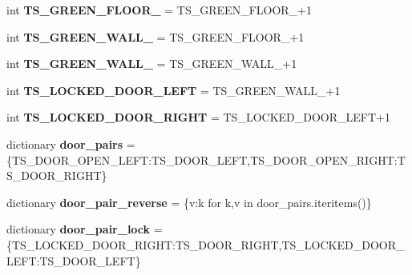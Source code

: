 \begin{DoxyCompactItemize}
\item 
\hypertarget{namespaceconstants_a92a2d451d178d3f6e24c56848dfb8287}{}int {\bfseries T\+S\+\_\+\+G\+R\+E\+E\+N\+\_\+\+F\+L\+O\+O\+R\+\_} = T\+S\+\_\+\+G\+R\+E\+E\+N\+\_\+\+F\+L\+O\+O\+R\+\_+1\label{namespaceconstants_a92a2d451d178d3f6e24c56848dfb8287}

\item 
\hypertarget{namespaceconstants_af18ce6dc21768935be0a46b621e1cbc2}{}int {\bfseries T\+S\+\_\+\+G\+R\+E\+E\+N\+\_\+\+W\+A\+L\+L\+\_} = T\+S\+\_\+\+G\+R\+E\+E\+N\+\_\+\+F\+L\+O\+O\+R\+\_+1\label{namespaceconstants_af18ce6dc21768935be0a46b621e1cbc2}

\item 
\hypertarget{namespaceconstants_a00c3306c4ec859606c2648abacd568d2}{}int {\bfseries T\+S\+\_\+\+G\+R\+E\+E\+N\+\_\+\+W\+A\+L\+L\+\_} = T\+S\+\_\+\+G\+R\+E\+E\+N\+\_\+\+W\+A\+L\+L\+\_+1\label{namespaceconstants_a00c3306c4ec859606c2648abacd568d2}

\item 
\hypertarget{namespaceconstants_a06dbe0933db77dc5753d87358e333291}{}int {\bfseries T\+S\+\_\+\+L\+O\+C\+K\+E\+D\+\_\+\+D\+O\+O\+R\+\_\+\+L\+E\+F\+T} = T\+S\+\_\+\+G\+R\+E\+E\+N\+\_\+\+W\+A\+L\+L\+\_+1\label{namespaceconstants_a06dbe0933db77dc5753d87358e333291}

\item 
\hypertarget{namespaceconstants_a42161cdb4b8067fbd531bb283c3a1cc9}{}int {\bfseries T\+S\+\_\+\+L\+O\+C\+K\+E\+D\+\_\+\+D\+O\+O\+R\+\_\+\+R\+I\+G\+H\+T} = T\+S\+\_\+\+L\+O\+C\+K\+E\+D\+\_\+\+D\+O\+O\+R\+\_\+\+L\+E\+F\+T+1\label{namespaceconstants_a42161cdb4b8067fbd531bb283c3a1cc9}

\item 
\hypertarget{namespaceconstants_acee0d9ba287ea1041ff210299cc5dca2}{}dictionary {\bfseries door\+\_\+pairs} = \{T\+S\+\_\+\+D\+O\+O\+R\+\_\+\+O\+P\+E\+N\+\_\+\+L\+E\+F\+T\+:\+T\+S\+\_\+\+D\+O\+O\+R\+\_\+\+L\+E\+F\+T,T\+S\+\_\+\+D\+O\+O\+R\+\_\+\+O\+P\+E\+N\+\_\+\+R\+I\+G\+H\+T\+:\+T\+S\+\_\+\+D\+O\+O\+R\+\_\+\+R\+I\+G\+H\+T\}\label{namespaceconstants_acee0d9ba287ea1041ff210299cc5dca2}

\item 
\hypertarget{namespaceconstants_a7055052dd09e7b35cd97e2f18f3c769b}{}dictionary {\bfseries door\+\_\+pair\+\_\+reverse} = \{v\+:k for k,v in door\+\_\+pairs.\+iteritems()\}\label{namespaceconstants_a7055052dd09e7b35cd97e2f18f3c769b}

\item 
\hypertarget{namespaceconstants_a507478c5bde2412b357102148027fb70}{}dictionary {\bfseries door\+\_\+pair\+\_\+lock} = \{T\+S\+\_\+\+L\+O\+C\+K\+E\+D\+\_\+\+D\+O\+O\+R\+\_\+\+R\+I\+G\+H\+T\+:\+T\+S\+\_\+\+D\+O\+O\+R\+\_\+\+R\+I\+G\+H\+T,T\+S\+\_\+\+L\+O\+C\+K\+E\+D\+\_\+\+D\+O\+O\+R\+\_\+\+L\+E\+F\+T\+:\+T\+S\+\_\+\+D\+O\+O\+R\+\_\+\+L\+E\+F\+T\}\label{namespaceconstants_a507478c5bde2412b357102148027fb70}


\end{DoxyCompactItemize}

